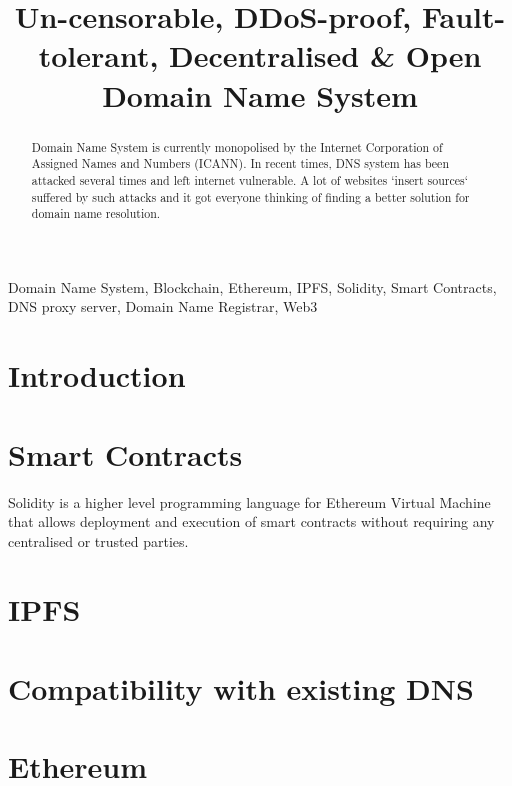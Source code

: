 \documentclass[conference]{IEEEtran}
\begin{document}
\title{Un-censorable, DDoS-proof, Fault-tolerant, Decentralised \& Open Domain Name System}

\author{
}

\maketitle

\begin{abstract}
Domain Name System is currently monopolised by the Internet Corporation of Assigned Names and Numbers (ICANN). In recent times, DNS system has been attacked several times and left internet vulnerable. A lot of websites `insert sources` suffered by such attacks and it got everyone thinking of finding a better solution for domain name resolution.
\end{abstract}

\vspace{\baselineskip}

\begin{IEEEkeywords}
Domain Name System, Blockchain, Ethereum, IPFS, Solidity, Smart Contracts, DNS proxy server, Domain Name Registrar, Web3
\end{IEEEkeywords}


\IEEEpeerreviewmaketitle

\section{Introduction}


\section{Smart Contracts}
Solidity is a higher level programming language for Ethereum Virtual Machine that allows deployment and execution of smart contracts without requiring any centralised or trusted parties. 

\section{IPFS}
\section{Compatibility with existing DNS}
\section{Ethereum}
\end{document}

